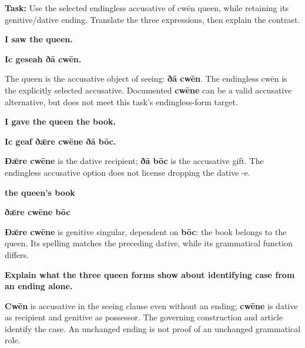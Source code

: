\textbf{Task:} Use the selected endingless accusative of cwēn queen, while retaining its genitive/\allowbreak{}dative ending. Translate the three expressions, then explain the contrast.

\textbf{I saw the queen.}

\textbf{Ic geseah ðā cwēn.}

The queen is the accusative object of seeing: \textbf{ðā cwēn}. The endingless cwēn is the explicitly selected accusative. Documented \textbf{cwēne} can be a valid accusative alternative, but does not meet this task's endingless-form target.

\textbf{I gave the queen the book.}

\textbf{Ic geaf ðǣre cwēne ðā bōc.}

\textbf{Ðǣre cwēne} is the dative recipient; \textbf{ðā bōc} is the accusative gift. The endingless accusative option does not license dropping the dative -e.

\textbf{the queen's book}

\textbf{ðǣre cwēne bōc}

\textbf{Ðǣre cwēne} is genitive singular, dependent on \textbf{bōc}: the book belongs to the queen. Its spelling matches the preceding dative, while its grammatical function differs.

\textbf{Explain what the three queen forms show about identifying case from an ending alone.}

\textbf{Cwēn} is accusative in the seeing clause even without an ending; \textbf{cwēne} is dative as recipient and genitive as possessor. The governing construction and article identify the case. An unchanged ending is not proof of an unchanged grammatical role.

